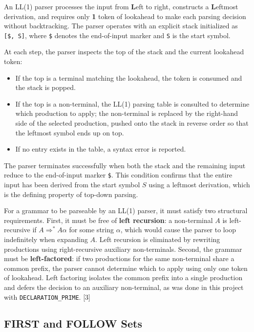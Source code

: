 \documentclass[letterpaper,12pt,oneside]{article}
\begin{document}
An LL(1) parser processes the input from \textbf{L}eft to right, constructs a \textbf{L}eftmost derivation, and requires only \textbf{1} token of lookahead to make each parsing decision without backtracking. The parser operates with an explicit stack initialized as \texttt{[\$,~S]}, where \texttt{\$} denotes the end-of-input marker and \texttt{S} is the start symbol.

At each step, the parser inspects the top of the stack and the current lookahead token:

\begin{itemize}
    \item If the top is a terminal matching the lookahead, the token is consumed and the stack is popped.
    \item If the top is a non-terminal, the LL(1) parsing table is consulted to determine which production to apply; the non-terminal is replaced by the right-hand side of the selected production, pushed onto the stack in reverse order so that the leftmost symbol ends up on top.
    \item If no entry exists in the table, a syntax error is reported.
\end{itemize}

The parser terminates successfully when both the stack and the remaining input reduce to the end-of-input marker \texttt{\$}. This condition confirms that the entire input has been derived from the start symbol $S$ using a leftmost derivation, which is the defining property of top-down parsing.

For a grammar to be parseable by an LL(1) parser, it must satisfy two structural requirements. First, it must be free of \textbf{left recursion}: a non-terminal $A$ is left-recursive if $A \Rightarrow^{*} A\alpha$ for some string $\alpha$, which would cause the parser to loop indefinitely when expanding $A$. Left recursion is eliminated by rewriting productions using right-recursive auxiliary non-terminals. Second, the grammar must be \textbf{left-factored}: if two productions for the same non-terminal share a common prefix, the parser cannot determine which to apply using only one token of lookahead. Left factoring isolates the common prefix into a single production and defers the decision to an auxiliary non-terminal, as was done in this project with \texttt{DECLARATION\_PRIME}. [3]

\subsection{FIRST and FOLLOW Sets}
\end{document}

